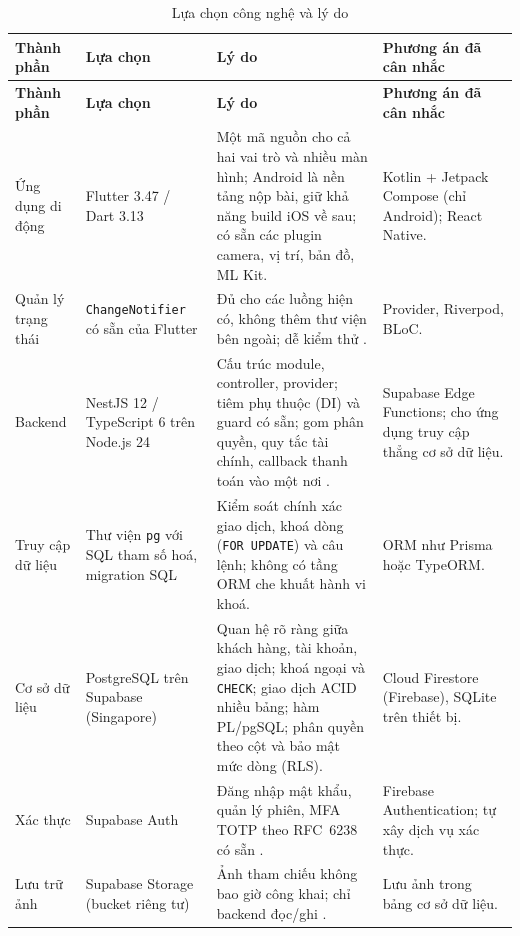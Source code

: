 {\small
\begin{longtable}{>{\raggedright\arraybackslash}p{}>{\raggedright\arraybackslash}p{}>{\raggedright\arraybackslash}p{}>{\raggedright\arraybackslash}p{}}
\caption{Lựa chọn công nghệ và lý do}\label{tab:ch2-tech}\\
\toprule
\textbf{Thành phần} & \textbf{Lựa chọn} & \textbf{Lý do} & \textbf{Phương án đã cân nhắc} \\
\midrule
\endfirsthead
\toprule
\textbf{Thành phần} & \textbf{Lựa chọn} & \textbf{Lý do} & \textbf{Phương án đã cân nhắc} \\
\midrule
\endhead
\bottomrule
\endfoot
Ứng dụng di động & Flutter 3.47 / Dart 3.13 & Một mã nguồn cho cả hai vai trò và nhiều màn hình; Android là nền tảng nộp bài, giữ khả năng build iOS về sau; có sẵn các plugin camera, vị trí, bản đồ, ML Kit. & Kotlin + Jetpack Compose (chỉ Android); React Native. \\
Quản lý trạng thái & \texttt{Change\allowbreak{}Notifier} có sẵn của Flutter & Đủ cho các luồng hiện có, không thêm thư viện bên ngoài; dễ kiểm thử \parencite{ch2-flutter-state}. & Provider, Riverpod, BLoC. \\
Backend & NestJS 12 / TypeScript 6 trên Node.js 24 & Cấu trúc module, controller, provider; tiêm phụ thuộc (DI) và guard có sẵn; gom phân quyền, quy tắc tài chính, callback thanh toán vào một nơi \parencite{ch2-nestjs-providers,ch2-nestjs-guards}. & Supabase Edge Functions; cho ứng dụng truy cập thẳng cơ sở dữ liệu. \\
Truy cập dữ liệu & Thư viện \texttt{pg} với SQL tham số hoá, migration SQL & Kiểm soát chính xác giao dịch, khoá dòng (\texttt{FOR UPDATE}) và câu lệnh; không có tầng ORM che khuất hành vi khoá. & ORM như Prisma hoặc TypeORM. \\
Cơ sở dữ liệu & PostgreSQL trên Supabase (Singapore) & Quan hệ rõ ràng giữa khách hàng, tài khoản, giao dịch; khoá ngoại và \texttt{CHECK}; giao dịch ACID nhiều bảng; hàm PL/pgSQL; phân quyền theo cột và bảo mật mức dòng (RLS). & Cloud Firestore (Firebase), SQLite trên thiết bị. \\
Xác thực & Supabase Auth & Đăng nhập mật khẩu, quản lý phiên, MFA TOTP theo RFC~6238 có sẵn \parencite{ch2-supabase-auth,ch2-supabase-mfa,ch2-rfc6238}. & Firebase Authentication; tự xây dịch vụ xác thực. \\
Lưu trữ ảnh & Supabase Storage (bucket riêng tư) & Ảnh tham chiếu không bao giờ công khai; chỉ backend đọc/ghi \parencite{ch2-supabase-storage}. & Lưu ảnh trong bảng cơ sở dữ liệu. \\

\end{longtable}}
